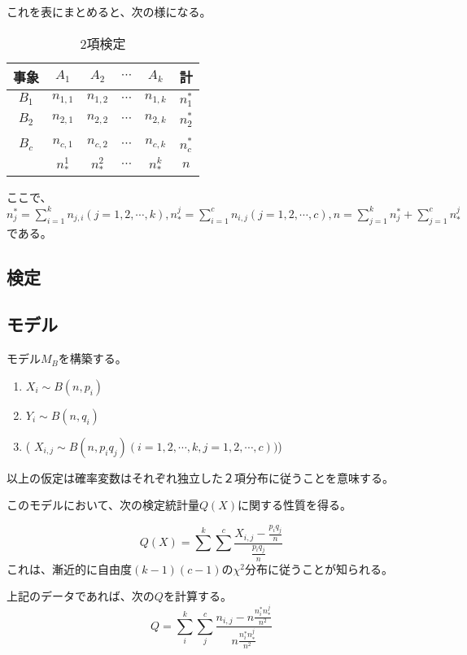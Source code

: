これを表にまとめると、次の様になる。
\begin{table}[hbtp]
 \caption{2項検定}
 \label{table:binomial_test2}
 \centering
\begin{tabular}{c|cccc|c}
 事象& $A_1$ & $A_2$ & $\cdots$ & $A_k$ & 計 \\ \hline
 $B_1$ & $n_{1,1}$ & $n_{1,2}$ & $\cdots$ & $n_{1,k}$ &$n_1^*$ \\ 
 $B_2$ & $n_{2,1}$ & $n_{2,2}$ & $\cdots$ & $n_{2,k}$ &  $n_2^*$ \\
 & & & & & \\
 $B_c$ & $n_{c,1}$ & $n_{c,2}$ & $\cdots$ & $n_{c,k}$ &  $n_c^*$ \\ 
       & $n_*^1$ & $n_*^2$     & $\cdots$ & $n_*^k $  & $n$
\end{tabular}
\end{table}
ここで、$n_j^* = \sum_{i=1}^k n_{j,i} (j=1,2,\cdots,k), n_*^j = \sum_{i=1}^c n_{i,j} (j=1,2,\cdots,c), n = \sum_{j=1}^k n_j^*+ \sum_{j=1}^c n_*^j$である。



\subsection{検定}


\subsection{モデル}
モデル$M_B$を構築する。
\begin{enumerate}
 \item $X_{i} \sim B(n,p_i)$
 \item $Y_{i} \sim B(n,q_i)$
 \item ( $X_{i,j} \sim B(n, p_i q_j)  (i=1,2,\cdots,k, j=1,2,\cdots,c))$)
\end{enumerate}
以上の仮定は確率変数はそれぞれ独立した２項分布に従うことを意味する。

このモデルにおいて、次の検定統計量$Q(X)$に関する性質を得る。

\begin{equation*}
 Q(X) = \sum^k \sum^c \frac{ X_{i,j} - \frac{p_i q_j}{n}}{\frac{p_i q_j}{n} }
\end{equation*}
これは、漸近的に自由度$(k-1)(c-1)$の$\chi^2$分布に従うことが知られる。

上記のデータであれば、次の$Q$を計算する。
\begin{equation*}
 Q = \sum_i^k \sum_j^c \frac{ n_{i,j} - n\frac{n_i^* n_*^j}{n^2}}{n\frac{n_i^* n_*^j}{n^2} }
\end{equation*}




